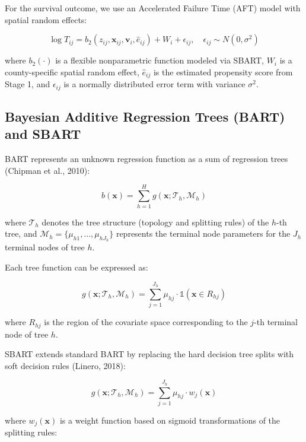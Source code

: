 \documentclass[useAMS,referee]{biom}
\begin{document}
For the survival outcome, we use an Accelerated Failure Time (AFT) model with spatial random effects:

\begin{equation}
\log T_{ij} = b_2(z_{ij}, \mathbf{x}_{ij}, \mathbf{v}_i, \hat{e}_{ij}) + W_i + \epsilon_{ij}, \quad \epsilon_{ij} \sim N(0, \sigma^2)
\end{equation}

where $b_2(\cdot)$ is a flexible nonparametric function modeled via SBART, $W_i$ is a county-specific spatial random effect, $\hat{e}_{ij}$ is the estimated propensity score from Stage 1, and $\epsilon_{ij}$ is a normally distributed error term with variance $\sigma^2$.

\subsection{Bayesian Additive Regression Trees (BART) and SBART}

BART represents an unknown regression function as a sum of regression trees (Chipman et al., 2010):

\begin{equation}
b(\mathbf{x}) = \sum_{h=1}^H g(\mathbf{x}; \mathcal{T}_h, \mathcal{M}_h)
\end{equation}

where $\mathcal{T}_h$ denotes the tree structure (topology and splitting rules) of the $h$-th tree, and $\mathcal{M}_h = \{\mu_{h1}, \ldots, \mu_{hJ_h}\}$ represents the terminal node parameters for the $J_h$ terminal nodes of tree $h$.

Each tree function can be expressed as:

\begin{equation}
g(\mathbf{x}; \mathcal{T}_h, \mathcal{M}_h) = \sum_{j=1}^{J_h} \mu_{hj} \cdot \mathds{1}(\mathbf{x} \in R_{hj})
\end{equation}

where $R_{hj}$ is the region of the covariate space corresponding to the $j$-th terminal node of tree $h$.

SBART extends standard BART by replacing the hard decision tree splits with soft decision rules (Linero, 2018):

\begin{equation}
g(\mathbf{x}; \mathcal{T}_h, \mathcal{M}_h) = \sum_{j=1}^{J_h} \mu_{hj} \cdot w_j(\mathbf{x})
\end{equation}

where $w_j(\mathbf{x})$ is a weight function based on sigmoid transformations of the splitting rules:
\end{document}
